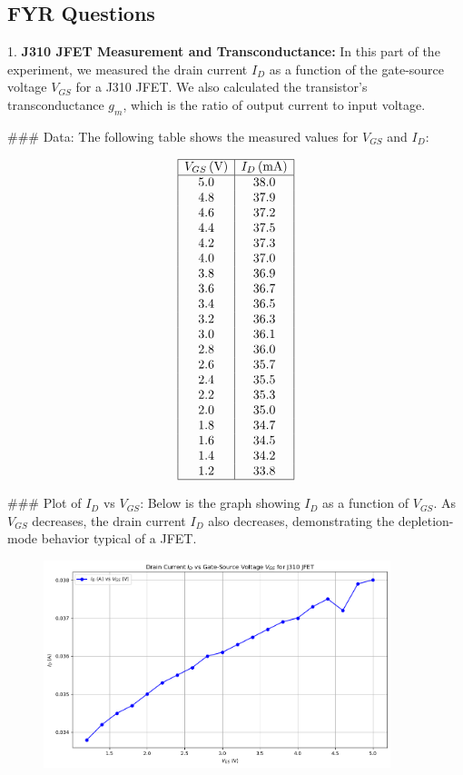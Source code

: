 \documentclass{article}
\begin{document}
\subsection*{FYR Questions}

1. \textbf{J310 JFET Measurement and Transconductance:}
In this part of the experiment, we measured the drain current \( I_D \) as a function of the gate-source voltage \( V_{GS} \) for a J310 JFET. We also calculated the transistor's transconductance \( g_m \), which is the ratio of output current to input voltage.

### Data:
The following table shows the measured values for \( V_{GS} \) and \( I_D \):

\[
\begin{array}{|c|c|}
\hline
V_{GS} \, (\text{V}) & I_D \, (\text{mA}) \\
\hline
5.0 & 38.0 \\
4.8 & 37.9 \\
4.6 & 37.2 \\
4.4 & 37.5 \\
4.2 & 37.3 \\
4.0 & 37.0 \\
3.8 & 36.9 \\
3.6 & 36.7 \\
3.4 & 36.5 \\
3.2 & 36.3 \\
3.0 & 36.1 \\
2.8 & 36.0 \\
2.6 & 35.7 \\
2.4 & 35.5 \\
2.2 & 35.3 \\
2.0 & 35.0 \\
1.8 & 34.7 \\
1.6 & 34.5 \\
1.4 & 34.2 \\
1.2 & 33.8 \\
\hline
\end{array}
\]

### Plot of \( I_D \) vs \( V_{GS} \):
Below is the graph showing \( I_D \) as a function of \( V_{GS} \). As \( V_{GS} \) decreases, the drain current \( I_D \) also decreases, demonstrating the depletion-mode behavior typical of a JFET.

\begin{figure}[H]
    \centering
    \includegraphics[width=0.9\textwidth]{./img/Lab6_1_IdVSVgs.png}
    \caption{}
    \label{fig:graph1} 
\end{figure}
\end{document}
